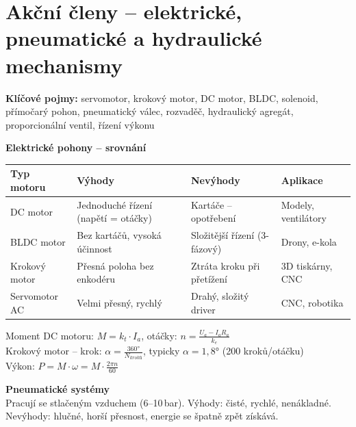 \documentclass[a4paper,10pt]{article}
\begin{document}
\newpage

\section{Akční členy -- elektrické, pneumatické a hydraulické mechanismy}

\begin{pojmybox}
\textbf{Klíčové pojmy:}
servomotor, krokový motor, DC motor, BLDC, solenoid,
přímočarý pohon, pneumatický válec, rozvaděč, hydraulický agregát,
proporcionální ventil, řízení výkonu
\end{pojmybox}

\begin{vysvetlenibox}
\textbf{Elektrické pohony -- srovnání}

\begin{center}
\begin{tabularx}{0.95\linewidth}{@{} l X X X @{}}
    \toprule
    \textbf{Typ motoru} & \textbf{Výhody} & \textbf{Nevýhody}
                        & \textbf{Aplikace} \\
    \midrule
    DC motor       & Jednoduché řízení (napětí = otáčky)
                   & Kartáče -- opotřebení & Modely, ventilátory \\
    BLDC motor     & Bez kartáčů, vysoká účinnost
                   & Složitější řízení (3-fázový) & Drony, e-kola \\
    Krokový motor  & Přesná poloha bez enkodéru
                   & Ztráta kroku při přetížení & 3D tiskárny, CNC \\
    Servomotor AC  & Velmi přesný, rychlý
                   & Drahý, složitý driver & CNC, robotika \\
    \bottomrule
\end{tabularx}
\end{center}

\begin{vzorcebox}
Moment DC motoru: $M = k_t \cdot I_a$,
otáčky: $n = \frac{U_a - I_a R_a}{k_e}$\\
Krokový motor -- krok: $\alpha = \frac{360°}{N_{kroků}}$,
typicky $\alpha = 1{,}8°$ (200 kroků/otáčku)\\
Výkon: $P = M \cdot \omega = M \cdot \frac{2\pi n}{60}$
\end{vzorcebox}

\textbf{Pneumatické systémy}\\
Pracují se stlačeným vzduchem (6--10\,bar).
Výhody: čisté, rychlé, nenákladné.
Nevýhody: hlučné, horší přesnost, energie se špatně zpět získává.


\end{vysvetlenibox}
\end{document}
